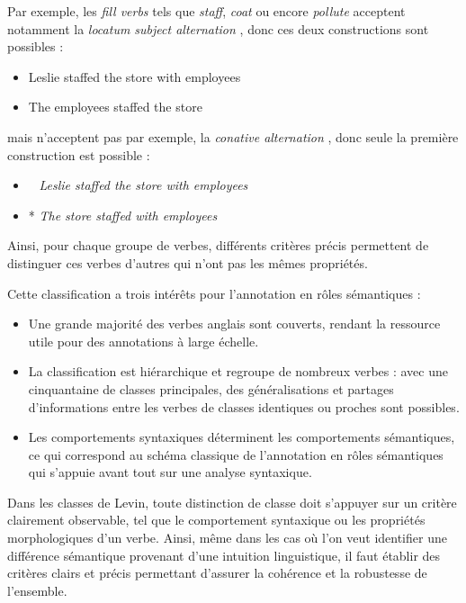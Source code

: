 Par exemple, les \emph{fill verbs} tels que \emph{staff}, \emph{coat} ou encore
\emph{pollute} \citep[p.~119]{levin1993english} acceptent notamment la
\emph{locatum subject alternation} \citep[p.~85]{levin1993english}, donc ces
deux constructions sont possibles :

\begin{itemize}
    \item Leslie staffed the store with employees
    \item The employees staffed the store
\end{itemize}

mais n'acceptent pas par exemple, la \emph{conative alternation}
\citep[p.~41]{levin1993english}, donc seule la première construction est
possible :

\begin{itemize}
    \item ~ \emph{Leslie staffed the store with employees}
    \item * \emph{The store staffed with employees}
\end{itemize}

Ainsi, pour chaque groupe de verbes, différents critères précis permettent de
distinguer ces verbes d'autres qui n'ont pas les mêmes propriétés.

Cette classification a trois intérêts pour l'annotation en rôles sémantiques :

\begin{itemize}

    \item Une grande majorité des verbes anglais sont couverts, rendant la
    ressource utile pour des annotations à large échelle.

    \item La classification est hiérarchique et regroupe de nombreux verbes :
    avec une cinquantaine de classes principales, des généralisations et
    partages d'informations entre les verbes de classes identiques ou proches
    sont possibles.

    \item Les comportements syntaxiques déterminent les comportements
    sémantiques, ce qui correspond au schéma classique de l'annotation en rôles
    sémantiques qui s'appuie avant tout sur une analyse syntaxique.

\end{itemize}

Dans les classes de Levin, toute distinction de classe doit s'appuyer sur un
critère clairement observable, tel que le comportement syntaxique ou les
propriétés morphologiques d'un verbe. Ainsi, même dans les cas où l'on veut
identifier une différence sémantique provenant d'une intuition linguistique, il
faut établir des critères clairs et précis permettant d'assurer la cohérence et
la robustesse de l'ensemble.

